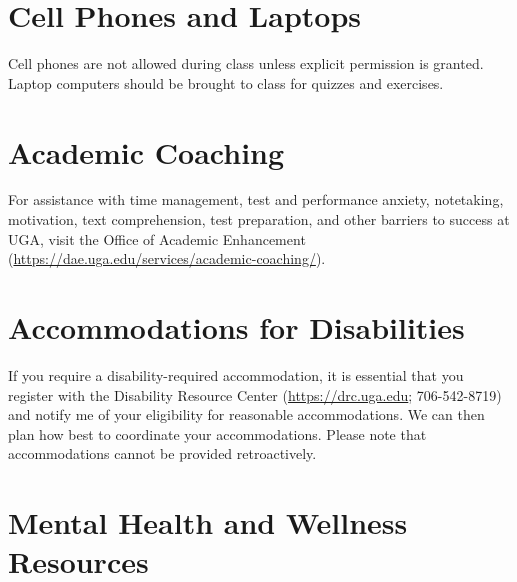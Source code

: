 \documentclass[12pt]{article}
\begin{document}
\section*{\normalsize Cell Phones and Laptops}
\vspace{-4mm}
Cell phones are not allowed during class unless explicit permission is
granted. Laptop computers should be brought to class for quizzes and
exercises.


\vspace{-2mm}
\section*{\normalsize Academic Coaching}
\vspace{-4mm}

For assistance with time management, test and performance anxiety,
notetaking, motivation, text comprehension, test preparation, and
other barriers to success at UGA, visit the Office of Academic
Enhancement (\url{https://dae.uga.edu/services/academic-coaching/}). 

\vspace{-2mm}
\section*{\normalsize Accommodations for Disabilities}
\vspace{-4mm}

If you require a disability-required accommodation, it is essential
that you register with the Disability Resource Center (\url{https://drc.uga.edu}; 706-542-8719)
and notify me of your eligibility for reasonable accommodations. We
can then plan how best to coordinate your accommodations. Please note
that accommodations cannot be provided retroactively.



\vspace{-2mm}
\section*{\normalsize Mental Health and Wellness Resources}
\vspace{-4mm}
\end{document}
